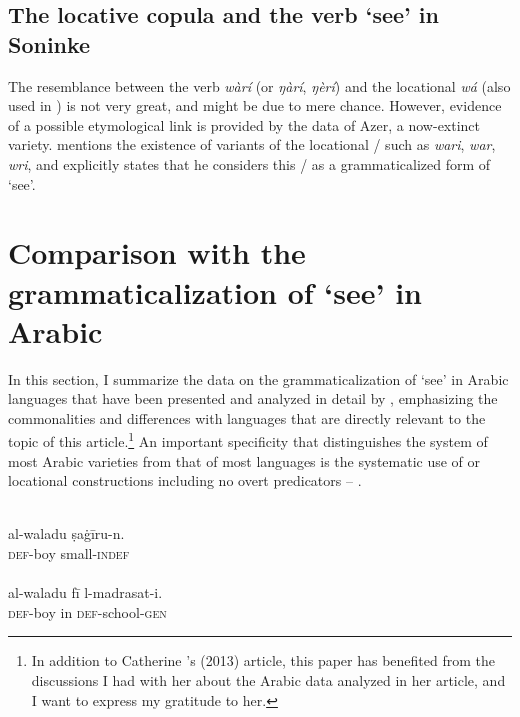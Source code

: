 \documentclass[output=paper]{langsci/langscibook}
\begin{document}
\subsection{The locative copula and the verb ‘see’ in Soninke}\label{sec:creissels:4.3}

The resemblance between the  verb \textit{wàrí} (or \textit{ŋàrí}, \textit{ŋèrí}) and the locational  \textit{wá} (also used in  ) is not very great, and might be due to mere chance. However, evidence of a possible etymological link is provided by the data of Azer, a now-extinct  variety. \citet[42--44]{Monteil1939} mentions the existence of variants of the locational /  such as \textit{wari}, \textit{war}, \textit{wri}, and explicitly states that he considers this / as a grammaticalized form of ‘see’.

\section{Comparison with the grammaticalization of ‘see’ in Arabic}\label{sec:creissels:5}

In this section, I summarize the data on the grammaticalization of ‘see’ in Arabic languages that have been presented and analyzed in detail by \citet{Taine-Cheikh2013}, emphasizing the commonalities and differences with  languages that are directly relevant to the topic of this article.{}\footnote{In addition to Catherine \citeauthor{Taine-Cheikh2013}’s (2013) article, this paper has benefited from the discussions I had with her about the Arabic data analyzed in her article, and I want to express my gratitude to her.}
An important specificity that distinguishes the  system of most Arabic varieties from that of most  languages is the systematic use of  or locational  constructions including no overt predicators –  .\newpage

\ea
    \label{ex:creissels:7}
   \\
   \ea
    \gll   al-waladu  ṣa\.gīru-n.\\
       \textsc{def}-boy  small-\textsc{indef}\\
      \\
   \ex
    \gll   al-waladu  fī  l-madrasat-i.\\
       \textsc{def}-boy  in  \textsc{def}-school-\textsc{gen}\\
\z
\z
\end{document}

